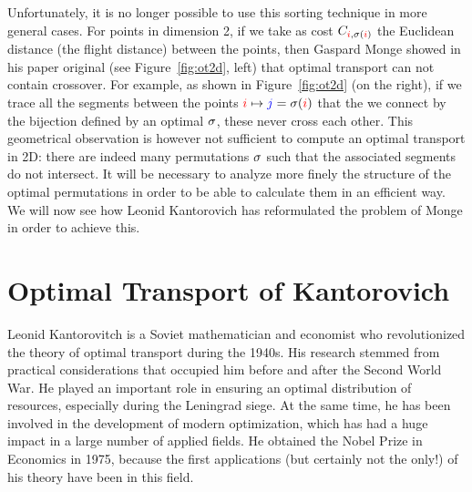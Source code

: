 Unfortunately, it is no longer possible to use this sorting technique in more general cases. For points in dimension 2, if we take as cost $C_{{\color{red}i}, \sigma ({\color{red}i})}$  the Euclidean distance (the flight distance) between the points, then Gaspard Monge showed in his paper original (see Figure~\ref{fig:ot2d}, left) that optimal transport can not contain crossover. For example, as shown in Figure~\ref{fig:ot2d} (on the right), if we trace all the segments between the points ${\color{red}i} \mapsto {\color{blue}j} = \sigma ({\color{red}i})$ that the we connect by the bijection defined by an optimal $\sigma$, these never cross each other. 
%
This geometrical observation is however not sufficient to compute an optimal transport in 2D: there are indeed many permutations $\sigma$ such that the associated segments do not intersect.
%
It will be necessary to analyze more finely the structure of the optimal permutations in order to be able to calculate them in an efficient way.
%
We will now see how Leonid Kantorovich has reformulated the problem of Monge in order to achieve this.


\section{Optimal Transport of Kantorovich}
\label{sec-kanto}

Leonid Kantorovitch is a Soviet mathematician and economist who revolutionized the theory of optimal transport during the 1940s. His research stemmed from practical considerations that occupied him before and after the Second World War. He played an important role in ensuring an optimal distribution of resources, especially during the Leningrad siege.
%
At the same time, he has been involved in the development of modern optimization, which has had a huge impact in a large number of applied fields. He obtained the Nobel Prize in Economics in 1975, because the first applications (but certainly not the only!) of his theory have been in this field.



